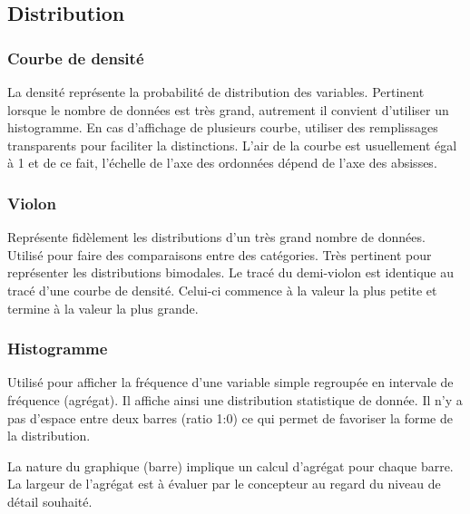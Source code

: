 \documentclass[a4paper,12pt]{article}
\begin{document}
\begin{multicols}{2}
\subsection{Distribution}
\label{sec:org414fb8c}
\subsubsection{Courbe de densité}
\label{sec:orge074451}
La densité représente la probabilité de distribution des variables. \autocite{sosulskiGraphics2019} Pertinent lorsque le nombre de données est très grand, autrement il convient d'utiliser un histogramme. \autocite{wilkeVisualizingManyDistributions2019} En cas d'affichage de plusieurs courbe, utiliser  des remplissages transparents pour faciliter la distinctions. L'air de la courbe est usuellement égal à 1 et de ce fait, l'échelle de l'axe des ordonnées dépend de l'axe des absisses. \autocite{wilkeVisualizingManyDistributions2019}
\subsubsection{Violon}
\label{sec:org6e9269f}
Représente fidèlement les distributions d'un très grand nombre de données. \autocite{alansmithLexiqueVisuel} Utilisé pour faire des comparaisons entre des catégories. \autocite{mikeyiHowChooseRight2020}  Très pertinent pour représenter les distributions bimodales. \autocite{wilkeVisualizingManyDistributions2019} Le tracé du demi-violon est identique au tracé d'une courbe de densité. Celui-ci commence à la valeur la plus petite et termine à la valeur la plus grande.
\subsubsection{Histogramme}
\label{sec:org64dcf3e}
Utilisé pour afficher la fréquence d'une variable simple regroupée en intervale de fréquence (agrégat).\autocite{sosulskiGraphics2019} Il affiche ainsi une distribution statistique de donnée. Il n'y a pas d'espace entre deux barres (ratio 1:0) ce qui permet de favoriser la forme de la distribution. \autocite{alansmithLexiqueVisuel}

La nature du graphique (barre) implique un calcul d'agrégat pour chaque barre. \autocite{wilkeVisualizingDistributionsHistograms2019} La largeur de l'agrégat est à évaluer par le concepteur au regard du niveau de détail souhaité.\autocite{wilkeVisualizingDistributionsHistograms2019}


\end{multicols}
\end{document}
